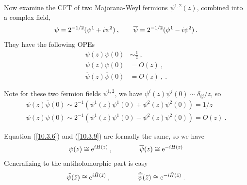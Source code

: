 	Now examine the CFT of two Majorana-Weyl fermions $\psi^{1,2}(z)$, combined into a complex field,
	\begin{equation}
		\psi=2^{-1/2}(\psi^{1}+i\psi^{2})\:, \qquad \overline{\psi}=2^{-1/2}(\psi^{1}-i\psi^{2})\:.\label{10.3.8}
	\end{equation}
	They have the following OPEs
	\begin{subequations}
		\begin{align}
			\psi(z)\overline{\psi}(0)&\sim\frac{1}{z} \:, \label{10.3.9a} \\
			\psi(z)\psi(0) &= O(z) \:, \label{10.3.9b} \\
			\overline{\psi}(z)\overline{\psi}(0) &= O(z) \:, \label{10.3.9c}\:.
		\end{align} \label{10.3.9}
	\end{subequations}
	\begin{tcolorbox}[breakable]
		Note for these two fermion fields $\psi^{1,2}$, we have $\psi^{i}(z)\psi^{j}(0)\sim \delta_{ij}/z$, so
		\begin{gather*}
			\psi(z)\overline{\psi}(0) \sim 2^{-1} (\psi^{1}(z)\psi^{1}(0)+\psi^{2}(z)\psi^{2}(0)) = 1/z \\
			\psi(z)\psi(0) \sim 2^{-1} (\psi^{1}(z)\psi^{1}(0)-\psi^{2}(z)\psi^{2}(0)) = O(z) \:.
		\end{gather*}
	\end{tcolorbox}
	Equation (\ref{10.3.6}) and (\ref{10.3.9}) are formally the same, so we have
	\begin{equation}
		\psi(z)\cong \mathrm{e}^{i H(z)} \:, \qquad \qquad \overline{\psi}(z)\cong \mathrm{e}^{-i H(z)} \label{10.3.10}
	\end{equation}
	Generalizing to the antiholomorphic part is easy
	\begin{equation}
		\tilde{\psi}(\bar{z}) \cong \mathrm{e}^{i\tilde{H}(\bar{z})} \:, \qquad \qquad
		\tilde{\overline{\psi}}(\bar{z})\cong \mathrm{e}^{-i\tilde{H}(\bar{z})} \:. \label{10.3.11}
	\end{equation}
	
